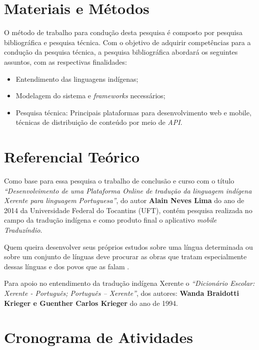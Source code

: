 \documentclass[journal]{IEEEtran}
\begin{document}
\section{Materiais e Métodos}

O método de trabalho para condução desta pesquisa é composto por pesquisa bibliográfica e pesquisa técnica. Com o objetivo de adquirir competências para a condução da pesquisa técnica, a pesquisa bibliográfica abordará os seguintes assuntos, com as respectivas finalidades:
\\
\begin{itemize}
    \item Entendimento das linguagens indígenas;
    \item Modelagem do sistema e {\it frameworks} necessários;
    \item Pesquisa técnica: Principais plataformas para desenvolvimento web e mobile, técnicas de distribuição de conteúdo por meio de {\it API}.
\end{itemize}

\section{Referencial Teórico}

Como base para essa pesquisa o trabalho de conclusão e curso com o título {\it “Desenvolvimento de uma Plataforma Online de tradução da linguagem indígena Xerente para linguagem Portuguesa”}, do autor {\bf Alain Neves Lima} do ano de 2014 da Universidade Federal do Tocantins (UFT), contém pesquisa realizada no campo da tradução indígena e como produto final o aplicativo {\it mobile  Traduzíndio}.


Quem queira desenvolver seus próprios estudos sobre uma língua determinada ou sobre um conjunto de línguas deve procurar as obras que tratam especialmente dessas línguas e dos povos que as falam \cite{rodrigues2002}.

Para apoio no entendimento da tradução indígena Xerente o {\it “Dicionário Escolar: Xerente - Português; Português – Xerente”}, dos autores: {\bf Wanda Braidotti Krieger e Guenther Carlos Krieger} do ano de 1994.

\section{Cronograma de Atividades}
\end{document}
